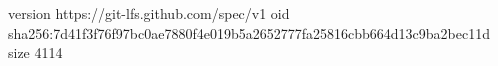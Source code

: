 version https://git-lfs.github.com/spec/v1
oid sha256:7d41f3f76f97bc0ae7880f4e019b5a2652777fa25816cbb664d13c9ba2bec11d
size 4114
